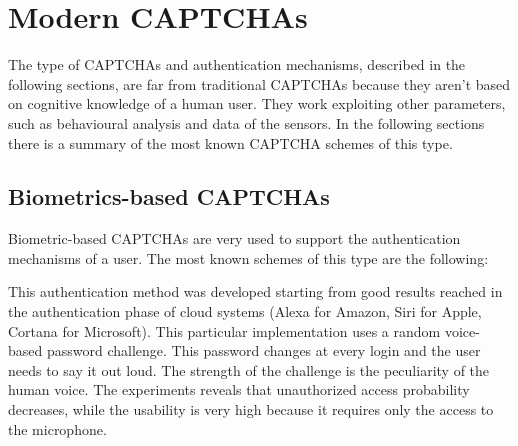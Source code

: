 \section{Modern CAPTCHAs}
The type of CAPTCHAs and authentication mechanisms, described in the following sections, are far from traditional CAPTCHAs because they aren't based on cognitive knowledge of a human user. They work exploiting other parameters, such as behavioural analysis and data of the sensors. In the following sections there is a summary of the most known CAPTCHA schemes of this type.

\subsection{Biometrics-based CAPTCHAs}
Biometric-based CAPTCHAs are very used to support the authentication mechanisms of a user. The most known schemes of this type are the following:
\begin{itemize}
{This authentication method was developed starting from good results reached in the authentication phase of cloud systems\cite{voice_CAPTCHA} (Alexa for Amazon, Siri for Apple, Cortana for Microsoft). This particular implementation uses a random voice-based password challenge. This password changes at every login and the user needs to say it out loud. The strength of the challenge is the peculiarity of the human voice. The experiments reveals that unauthorized access probability decreases, while the usability is very high because it requires only the access to the microphone.}
\end{itemize}

